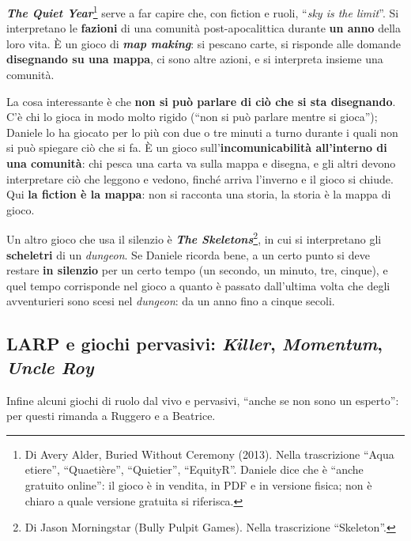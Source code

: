 \textbf{\emph{The Quiet Year}}\footnote{Di Avery Alder, Buried Without Ceremony (2013). Nella
trascrizione ``Aqua etiere'', ``Quaetière'', ``Quietier'', ``EquityR''. Daniele dice che è
``anche gratuito online'': il gioco è in vendita, in PDF e in versione fisica; non è chiaro a
quale versione gratuita si riferisca.} serve a far capire che, con fiction e ruoli, ``\emph{sky
is the limit}''. Si interpretano le \textbf{fazioni} di una comunità post-apocalittica durante
\textbf{un anno} della loro vita. È un gioco di \textbf{\emph{map making}}: si pescano carte, si
risponde alle domande \textbf{disegnando su una mappa}, ci sono altre azioni, e si interpreta
insieme una comunità.

La cosa interessante è che \textbf{non si può parlare di ciò che si sta disegnando}. C'è chi lo
gioca in modo molto rigido (``non si può parlare mentre si gioca''); Daniele lo ha giocato per lo
più con due o tre minuti a turno durante i quali non si può spiegare ciò che si fa. È un gioco
sull'\textbf{incomunicabilità all'interno di una comunità}: chi pesca una carta va sulla mappa e
disegna, e gli altri devono interpretare ciò che leggono e vedono, finché arriva l'inverno e il
gioco si chiude. Qui \textbf{la fiction è la mappa}: non si racconta una storia, la storia è la
mappa di gioco.

Un altro gioco che usa il silenzio è \textbf{\emph{The Skeletons}}\footnote{Di Jason Morningstar
(Bully Pulpit Games). Nella trascrizione ``Skeleton''.}, in cui si interpretano gli
\textbf{scheletri} di un \emph{dungeon}. Se Daniele ricorda bene, a un certo punto si deve restare
\textbf{in silenzio} per un certo tempo (un secondo, un minuto, tre, cinque), e quel tempo
corrisponde nel gioco a quanto è passato dall'ultima volta che degli avventurieri sono scesi nel
\emph{dungeon}: da un anno fino a cinque secoli.

\subsection{LARP e giochi pervasivi: \emph{Killer}, \emph{Momentum}, \emph{Uncle Roy}}



Infine alcuni giochi di ruolo dal vivo e pervasivi, ``anche se non sono un esperto'': per questi
rimanda a Ruggero e a Beatrice.

